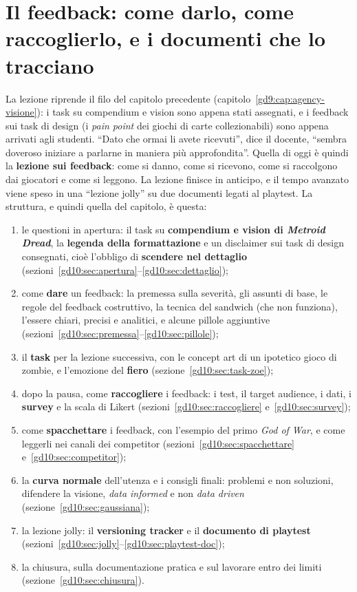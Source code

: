 \chapter[Dare, raccogliere e tracciare il feedback]{Il feedback: come
darlo, come raccoglierlo, e i documenti che lo tracciano}
\label{gd10:cap:feedback}

La lezione riprende il filo del capitolo precedente
(capitolo~\ref{gd9:cap:agency-visione}): i task su compendium e vision sono
appena stati assegnati, e i feedback sui task di design (i \emph{pain point}
dei giochi di carte collezionabili) sono appena arrivati agli studenti.
``Dato che ormai li avete ricevuti'', dice il docente, ``sembra doveroso
iniziare a parlarne in maniera più approfondita''. Quella di oggi è quindi
la \textbf{lezione sui feedback}: come si danno, come si ricevono, come si
raccolgono dai giocatori e come si leggono. La lezione finisce in anticipo,
e il tempo avanzato viene speso in una ``lezione jolly'' su due documenti
legati al playtest. La struttura, e quindi quella del capitolo, è questa:
\begin{enumerate}
  \item le questioni in apertura: il task su \textbf{compendium e vision di
        \emph{Metroid Dread}}, la \textbf{legenda della formattazione} e un
        disclaimer sui task di design consegnati, cioè l'obbligo di
        \textbf{scendere nel dettaglio}
        (sezioni~\ref{gd10:sec:apertura}--\ref{gd10:sec:dettaglio});
  \item come \textbf{dare} un feedback: la premessa sulla severità, gli
        assunti di base, le regole del feedback costruttivo, la tecnica
        del sandwich (che non funziona), l'essere chiari, precisi e
        analitici, e alcune pillole aggiuntive
        (sezioni~\ref{gd10:sec:premessa}--\ref{gd10:sec:pillole});
  \item il \textbf{task} per la lezione successiva, con le concept art di
        un ipotetico gioco di zombie, e l'emozione del \textbf{fiero}
        (sezione~\ref{gd10:sec:task-zoe});
  \item dopo la pausa, come \textbf{raccogliere} i feedback: i test, il
        target audience, i dati, i \textbf{survey} e la scala di Likert
        (sezioni~\ref{gd10:sec:raccogliere} e~\ref{gd10:sec:survey});
  \item come \textbf{spacchettare} i feedback, con l'esempio del primo
        \emph{God of War}, e come leggerli nei canali dei competitor
        (sezioni~\ref{gd10:sec:spacchettare}
        e~\ref{gd10:sec:competitor});
  \item la \textbf{curva normale} dell'utenza e i consigli finali:
        problemi e non soluzioni, difendere la visione, \emph{data
        informed} e non \emph{data driven}
        (sezione~\ref{gd10:sec:gaussiana});
  \item la lezione jolly: il \textbf{versioning tracker} e il
        \textbf{documento di playtest}
        (sezioni~\ref{gd10:sec:jolly}--\ref{gd10:sec:playtest-doc});
  \item la chiusura, sulla documentazione pratica e sul lavorare entro dei
        limiti (sezione~\ref{gd10:sec:chiusura}).
\end{enumerate}

